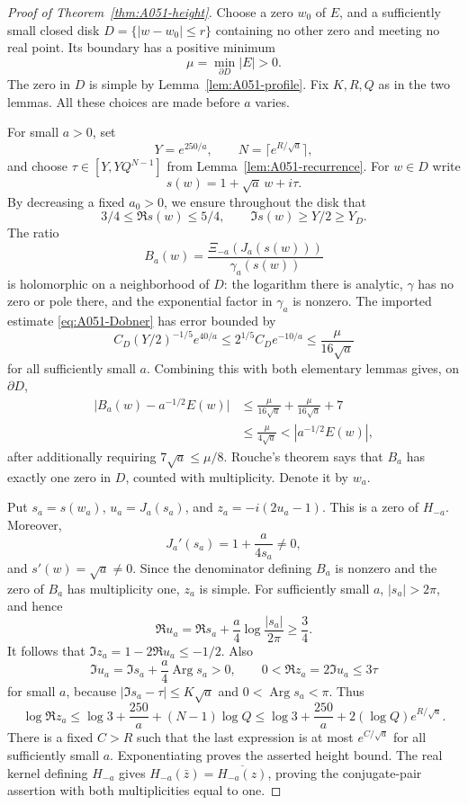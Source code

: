 \begin{proof}[Proof of Theorem~\ref{thm:A051-height}]
Choose a zero \(w_0\) of \(E\), and a sufficiently small closed
disk \(D=\{|w-w_0|\le r\}\) containing no other zero and meeting
no real point. Its boundary has a positive minimum
\[
                      \mu=\min_{\partial D}|E|>0.
\]
The zero in \(D\) is simple by Lemma~\ref{lem:A051-profile}.
Fix \(K,R,Q\) as in the two lemmas. All these choices are made
before \(a\) varies.

For small \(a>0\), set
\[
                    Y=e^{250/a},\qquad
                    N=\lceil e^{R/\sqrt a}\rceil,
\]
and choose \(\tau\in[Y,YQ^{N-1}]\) from
Lemma~\ref{lem:A051-recurrence}.
For \(w\in D\) write
\[
                          s(w)=1+\sqrt a\,w+i\tau.
\]
By decreasing a fixed \(a_0>0\), we ensure throughout the disk that
\[
 3/4\le\Re s(w)\le5/4,\qquad
 \Im s(w)\ge Y/2\ge Y_D.
\]
The ratio
\[
       B_a(w)=\frac{\Xi_{-a}(J_a(s(w)))}{\gamma_a(s(w))}
\]
is holomorphic on a neighborhood of \(D\): the logarithm there
is analytic, \(\gamma\) has no zero or pole there, and the
exponential factor in \(\gamma_a\) is nonzero.
The imported estimate \eqref{eq:A051-Dobner} has error bounded by
\[
 C_D (Y/2)^{-1/5}e^{40/a}
                   \le 2^{1/5}C_De^{-10/a}
                   \le\frac\mu{16\sqrt a}
\]
for all sufficiently small \(a\).
Combining this with both elementary lemmas gives, on \(\partial D\),
\begin{align*}
 \big|B_a(w)-a^{-1/2}E(w)\big|
 &\le \frac\mu{16\sqrt a}+\frac\mu{16\sqrt a}+7\\
 &\le\frac\mu{4\sqrt a}
       <|a^{-1/2}E(w)|,
\end{align*}
after additionally requiring \(7\sqrt a\le\mu/8\).
Rouche's theorem says that \(B_a\) has exactly one zero in \(D\),
counted with multiplicity. Denote it by \(w_a\).

Put \(s_a=s(w_a)\), \(u_a=J_a(s_a)\), and
\(z_a=-i(2u_a-1)\). This is a zero of \(H_{-a}\).
Moreover,
\[
       J_a'(s_a)=1+\frac{a}{4s_a}\ne0,
\]
and \(s'(w)=\sqrt a\ne0\). Since the denominator defining \(B_a\)
is nonzero and the zero of \(B_a\) has multiplicity one,
\(z_a\) is simple.
For sufficiently small \(a\), \(|s_a|>2\pi\), and hence
\[
 \Re u_a=\Re s_a+\frac a4\log\frac{|s_a|}{2\pi}\ge\frac34.
\]
It follows that \(\Im z_a=1-2\Re u_a\le-1/2\).
Also
\[
 \Im u_a=\Im s_a+\frac a4\operatorname{Arg}s_a>0,
 \qquad 0<\Re z_a=2\Im u_a\le3\tau
\]
for small \(a\), because \(|\Im s_a-\tau|\le K\sqrt a\)
and \(0<\operatorname{Arg}s_a<\pi\).
Thus
\begin{equation}\label{eq:A051-heightbudget}
 \log\Re z_a
    \le\log3+\frac{250}{a}+(N-1)\log Q
    \le\log3+\frac{250}{a}+2(\log Q)e^{R/\sqrt a}.
\end{equation}
There is a fixed \(C>R\) such that the last expression is at
most \(e^{C/\sqrt a}\) for all sufficiently small \(a\).
Exponentiating proves the asserted height bound.
The real kernel defining \(H_{-a}\) gives
\(H_{-a}(\bar z)=\overline{H_{-a}(z)}\), proving the conjugate-pair
assertion with both multiplicities equal to one.


\end{proof}
